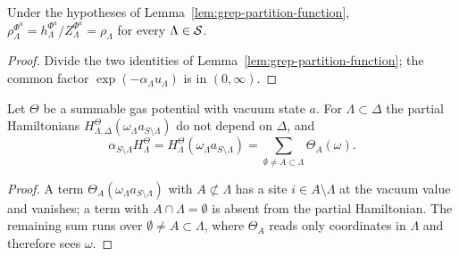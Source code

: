 \begin{proposition}[Georgii (2.30): $\rho = \rho^{\Phi^a}$]
    \label{prop:grep-rho-eq}
    \leanok

    Under the hypotheses of Lemma~\ref{lem:grep-partition-function},
    $\rho^{\Phi^a}_\Lambda = h^{\Phi^a}_\Lambda / Z^{\Phi^a}_\Lambda = \rho_\Lambda$
    for every $\Lambda \in \mathcal{S}$.
\end{proposition}
\begin{proof}
    \leanok

    Divide the two identities of Lemma~\ref{lem:grep-partition-function}; the common factor
    $\exp(-\alpha_\Lambda u_\Lambda)$ is in $(0,\infty)$.
\end{proof}

\begin{lemma}[Georgii (2.36) for $\alpha = \delta_a$]
    \label{lem:grep-hamiltonian-vacuum}
    \leanok

    Let $\Theta$ be a summable gas potential with vacuum state $a$.  For $\Lambda \subset \Delta$
    the partial Hamiltonians $H^\Theta_{\Lambda,\Delta}(\omega_\Lambda a_{S\setminus\Lambda})$ do
    not depend on $\Delta$, and
    \[
        \alpha_{S\setminus\Lambda} H^\Theta_\Lambda
        = H^\Theta_\Lambda(\omega_\Lambda a_{S\setminus\Lambda})
        = \sum_{\emptyset \neq A \subset \Lambda} \Theta_A(\omega).
    \]
\end{lemma}
\begin{proof}
    \leanok

    A term $\Theta_A(\omega_\Lambda a_{S\setminus\Lambda})$ with $A \not\subset \Lambda$ has a
    site $i \in A \setminus \Lambda$ at the vacuum value and vanishes; a term with
    $A \cap \Lambda = \emptyset$ is absent from the partial Hamiltonian.  The remaining sum runs
    over $\emptyset \neq A \subset \Lambda$, where $\Theta_A$ reads only coordinates in $\Lambda$
    and therefore sees $\omega$.
\end{proof}

